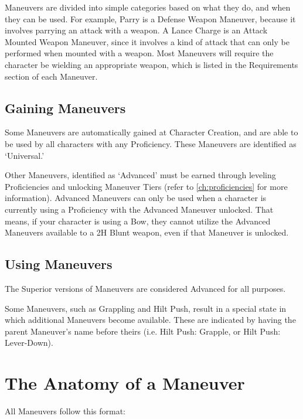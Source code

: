 \documentclass[oneside,11pt,english]{book}
\begin{document}
Maneuvers are divided into simple categories based on what they do, and when they can be used. For example, Parry is a Defense Weapon Maneuver, because it involves parrying an attack with a weapon. A Lance Charge is an Attack Mounted Weapon Maneuver, since it involves a kind of attack that can only be performed when mounted with a weapon. Most Maneuvers will require the character be wielding an appropriate weapon, which is listed in the Requirements section of each Maneuver.


\subsection{Gaining Maneuvers}
Some Maneuvers are automatically gained at Character Creation, and are able to be used by all characters with any Proficiency. These Maneuvers are identified as ‘Universal.’

Other Maneuvers, identified as ‘Advanced’ must be earned through leveling Proficiencies and unlocking Maneuver Tiers (refer to \autoref{ch:proficiencies} for more information). Advanced Maneuvers can only be used when a character is currently using a Proficiency with the Advanced Maneuver unlocked. That means, if your character is using a Bow, they cannot utilize the Advanced Maneuvers available to a 2H Blunt weapon, even if that Maneuver is unlocked.

\subsection{Using Maneuvers}
The Superior versions of Maneuvers are considered Advanced for all purposes.

Some Maneuvers, such as Grappling and Hilt Push, result in a special state in which additional Maneuvers become available. These are indicated by having the parent Maneuver’s name before theirs (i.e. Hilt Push: Grapple, or Hilt Push: Lever-Down).

\section{\label{sec:Maneuvers}The Anatomy of a Maneuver}
All Maneuvers follow this format:
\end{document}
